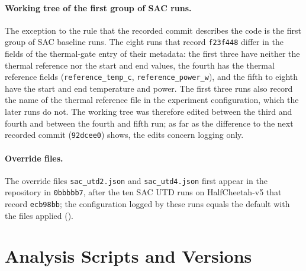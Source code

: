 \begin{table}[tbp]
  \centering
  \footnotesize
  \caption{Commits recorded in the metadata of the \num{280} canonical runs, in the order of their first use.
    The last column lists the changes of the training and measurement code relative to the previous row.}
  \label{tab:app-repro-commits}
\end{table}

\paragraph{Working tree of the first group of SAC runs.} The exception to the rule that the recorded commit describes the code is the first group of SAC baseline runs.
The eight runs that record \texttt{f23f448} differ in the fields of the thermal-gate entry of their metadata: the first three have neither the thermal reference nor the start and end values, the fourth has the thermal reference fields (\texttt{reference\_temp\_c}, \texttt{reference\_power\_w}), and the fifth to eighth have the start and end temperature and power.
The first three runs also record the name of the thermal reference file in the experiment configuration, which the later runs do not.
The working tree was therefore edited between the third and fourth and between the fourth and fifth run; as far as the difference to the next recorded commit (\texttt{92dcee0}) shows, the edits concern logging only.

\paragraph{Override files.} The override files \texttt{sac\_utd2.json} and \texttt{sac\_utd4.json} first appear in the repository in \texttt{0bbbbb7}, after the ten SAC UTD runs on HalfCheetah-v5 that record \texttt{ecb98bb}; the configuration logged by these runs equals the default with the files applied ().

\section{Analysis Scripts and Versions}\label{sec:app-repro-scripts}

